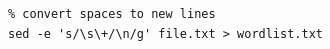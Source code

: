 \documentclass[9pt,xcolor=pdftex,dvipsnames,table]{beamer}
\begin{document}
\subsection{}
\begin{frame}[fragile]

\begin{verbatim}
% convert spaces to new lines
sed -e 's/\s\+/\n/g' file.txt > wordlist.txt
\end{verbatim}

\end{frame}

\subsection{}
\begin{frame}
\begin{center}
	\\
\end{center}
\end{frame}
\end{document}
